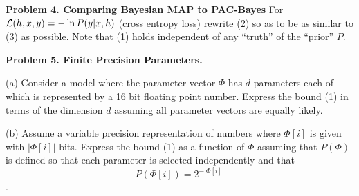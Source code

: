 \medskip
{\bf Problem 4. Comparing Bayesian MAP to PAC-Bayes}
For ${\cal L}(h,x,y) = - \ln P(y|x,h)$ (cross entropy loss) rewrite (2) so as to be as similar to (3) as possible.
Note that (1) holds independent of any ``truth'' of the ``prior'' $P$.


\bigskip
{\bf Problem 5. Finite Precision Parameters.}

\medskip
(a) Consider a model where the parameter vector $\Phi$ has $d$ parameters each of which is represented by a 16 bit floating point number.
Express the bound (1) in terms of the dimension $d$ assuming all parameter vectors are equally likely.


\medskip
(b) Assume a variable precision representation of numbers where $\Phi[i]$ is given with $|\Phi[i]|$ bits.  Express the bound (1) as a function of $\Phi$ assuming that $P(\Phi)$
is defined so that each parameter is selected independently and that
$$P(\Phi[i]) = 2^{-|\Phi[i]|}$$.


